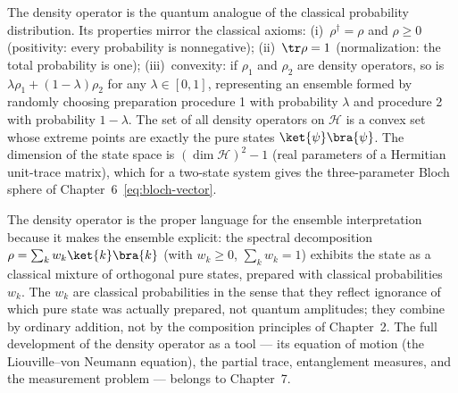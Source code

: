 The density operator is the quantum analogue of the classical probability distribution. Its properties mirror the classical axioms: (i)~$\rho^\dagger = \rho$ and $\rho \ge 0$ (positivity: every probability is nonnegative); (ii)~$\tr\rho = 1$ (normalization: the total probability is one); (iii)~convexity: if $\rho_1$ and $\rho_2$ are density operators, so is $\lambda\rho_1 + (1-\lambda)\rho_2$ for any $\lambda \in [0,1]$, representing an ensemble formed by randomly choosing preparation procedure 1 with probability $\lambda$ and procedure 2 with probability $1-\lambda$. The set of all density operators on $\mathcal{H}$ is a convex set whose extreme points are exactly the pure states $\ket{\psi}\bra{\psi}$. The dimension of the state space is $(\dim\mathcal{H})^2 - 1$ (real parameters of a Hermitian unit-trace matrix), which for a two-state system gives the three-parameter Bloch sphere of Chapter~6~\eqref{eq:bloch-vector}.

The density operator is the proper language for the ensemble interpretation because it makes the ensemble explicit: the spectral decomposition $\rho = \sum_k w_k \ket{k}\bra{k}$ (with $w_k \ge 0$, $\sum_k w_k = 1$) exhibits the state as a classical mixture of orthogonal pure states, prepared with classical probabilities $w_k$. The $w_k$ are classical probabilities in the sense that they reflect ignorance of which pure state was actually prepared, not quantum amplitudes; they combine by ordinary addition, not by the composition principles of Chapter~2. The full development of the density operator as a tool --- its equation of motion (the Liouville--von Neumann equation), the partial trace, entanglement measures, and the measurement problem --- belongs to Chapter~7.
